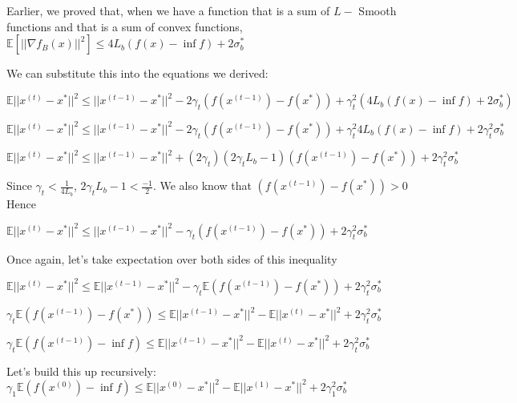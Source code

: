Earlier, we proved that, when we have a function that is a sum of $L-$ Smooth functions and that is a sum of convex functions, $\mathbb{E}[||\nabla f_B(x)||^2] \leq 4L_{b} (f(x) - \inf f) + 2 \sigma_b^*$ \newline 

We can substitute this into the equations we derived: \newline 

$\mathbb{E}||x^{(t)} - x^*||^2 \leq ||x^{(t - 1)} - x^*||^2 - 2\gamma_t (f(x^{(t - 1)}) - f(x^*)) + \gamma_t^2 (4L_{b} (f(x) - \inf f) + 2 \sigma_b^*) $ \newline 

$\mathbb{E}||x^{(t)} - x^*||^2 \leq ||x^{(t - 1)} - x^*||^2 - 2\gamma_t (f(x^{(t - 1)}) - f(x^*)) + \gamma_t^2 4L_{b} (f(x) - \inf f) + 2\gamma_t^2 \sigma_b^* $ \newline 

$\mathbb{E}||x^{(t)} - x^*||^2 \leq ||x^{(t - 1)} - x^*||^2 + (2 \gamma_t) (2 \gamma_t L_{b} - 1)(f(x^{(t - 1)}) - f(x^*)) + 2\gamma_t^2 \sigma_b^* $ \newline 

Since $\gamma_t < \frac{1}{4L_{b}}$, $2\gamma_t L_{b} - 1 < \frac{-1}{2}$. We also know that $(f(x^{(t - 1)}) - f(x^*)) > 0$ Hence \newline 

$\mathbb{E}||x^{(t)} - x^*||^2 \leq ||x^{(t - 1)} - x^*||^2 - \gamma_t (f(x^{(t - 1)}) - f(x^*)) + 2\gamma_t^2 \sigma_b^* $ \newline 

Once again, let's take expectation over both sides of this inequality \newline 

$\mathbb{E}||x^{(t)} - x^*||^2 \leq \mathbb{E} ||x^{(t - 1)} - x^*||^2 - \gamma_t \mathbb{E} (f(x^{(t - 1)}) - f(x^*)) + 2\gamma_t^2 \sigma_b^* $ \newline 

$\gamma_t \mathbb{E} (f(x^{(t - 1)}) - f(x^*)) \leq \mathbb{E} ||x^{(t - 1)} - x^*||^2 - \mathbb{E}||x^{(t)} - x^*||^2 + 2\gamma_t^2 \sigma_b^* $ \newline 

$\gamma_t \mathbb{E} (f(x^{(t - 1)}) - \inf f) \leq \mathbb{E} ||x^{(t - 1)} - x^*||^2 - \mathbb{E}||x^{(t)} - x^*||^2 + 2\gamma_t^2 \sigma_b^* $ \newline 

Let's build this up recursively: \newline 
$\gamma_1 \mathbb{E} (f(x^{(0)}) - \inf f) \leq \mathbb{E} ||x^{(0)} - x^*||^2 - \mathbb{E}||x^{(1)} - x^*||^2 + 2\gamma_1^2 \sigma_b^* $ \newline 


